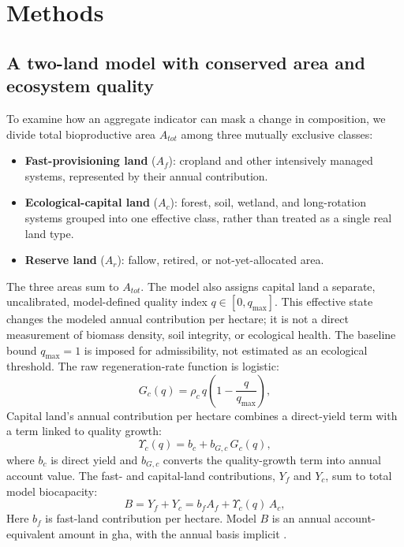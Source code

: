 \documentclass[preprint,12pt,authoryear]{elsarticle}
\newcommand{\Ups}{\Upsilon_c}
\begin{document}
\section{Methods}\label{sec:model}

\subsection{A two-land model with conserved area and ecosystem quality}\label{sec:equations}

To examine how an aggregate indicator can mask a change in composition, we divide total bioproductive area $A_{tot}$ among three mutually exclusive classes:
\begin{itemize}
  \item \textbf{Fast-provisioning land} ($A_f$): cropland and other intensively managed systems, represented by their annual contribution.
  \item \textbf{Ecological-capital land} ($A_c$): forest, soil, wetland, and long-rotation systems grouped into one effective class, rather than treated as a single real land type.
  \item \textbf{Reserve land} ($A_r$): fallow, retired, or not-yet-allocated area.
\end{itemize}
The three areas sum to $A_{tot}$. The model also assigns capital land a separate, uncalibrated, model-defined quality index $q\in[0,q_{\max}]$. This effective state changes the modeled annual contribution per hectare; it is not a direct measurement of biomass density, soil integrity, or ecological health. The baseline bound $q_{\max}=1$ is imposed for admissibility, not estimated as an ecological threshold. The raw regeneration-rate function is logistic:
\begin{equation}\label{eq:Gc}
G_c(q)=\rho_c\,q\left(1-\frac{q}{q_{\max}}\right),
\end{equation}
Capital land's annual contribution per hectare combines a direct-yield term with a term linked to quality growth:
\begin{equation}\label{eq:Ups}
\Ups(q)=b_c+b_{G,c}\,G_c(q),
\end{equation}
where $b_c$ is direct yield and $b_{G,c}$ converts the quality-growth term into annual account value. The fast- and capital-land contributions, $Y_f$ and $Y_c$, sum to total model biocapacity:
\begin{equation}\label{eq:B}
B=Y_f+Y_c=b_f A_f+\Ups(q)\,A_c ,
\end{equation}
Here $b_f$ is fast-land contribution per hectare. Model $B$ is an annual account-equivalent amount in gha, with the annual basis implicit \citep{GFNStandards2009,GFNGuidebook2019}.
\end{document}
